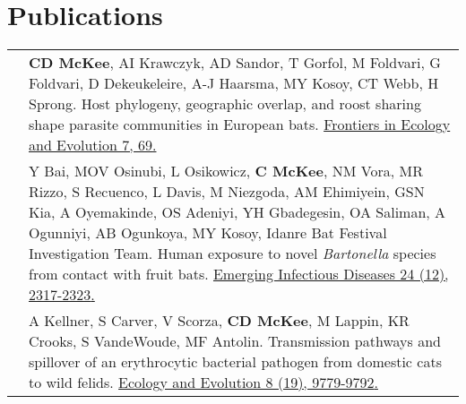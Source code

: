 \documentclass[letterpaper]{deedy-resume} %
\begin{document}
\section{Publications}
\begin{tabular}{>{\raggedright\arraybackslash}p{2cm}p{16cm}}

2019 & \textbf{CD McKee}, AI Krawczyk, AD Sandor, T Gorfol, M Foldvari, G Foldvari, D Dekeukeleire, A-J Haarsma, MY Kosoy, CT Webb, H Sprong. Host phylogeny, geographic overlap, and roost sharing shape parasite communities in European bats. \href{https://doi.org/10.3389/fevo.2019.00069}{\textcolor{special}{Frontiers in Ecology and Evolution 7, 69}.}\\

2018 & Y Bai, MOV Osinubi, L Osikowicz, \textbf{C McKee}, NM Vora, MR Rizzo, S Recuenco, L Davis, M Niezgoda, AM Ehimiyein, GSN Kia, A Oyemakinde, OS Adeniyi, YH Gbadegesin, OA Saliman, A Ogunniyi, AB Ogunkoya, MY Kosoy, Idanre Bat Festival Investigation Team. Human exposure to novel \textit{Bartonella} species from contact with fruit bats. \href{https://doi.org/10.3201/eid2412.181204}{\textcolor{special}{Emerging Infectious Diseases 24 (12), 2317-2323}.}\\

2018 & A Kellner, S Carver, V Scorza, \textbf{CD McKee}, M Lappin, KR Crooks, S VandeWoude, MF Antolin. Transmission pathways and spillover of an erythrocytic bacterial pathogen from domestic cats to wild felids. \href{https://doi.org/10.1002/ece3.4451}{\textcolor{special}{Ecology and Evolution 8 (19), 9779-9792}.}\\

\end{tabular}
\end{document}

